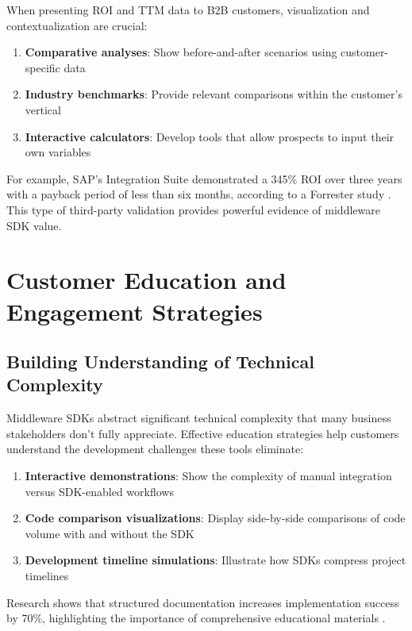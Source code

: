 \documentclass[11pt,a4paper]{article}
\begin{document}
When presenting ROI and TTM data to B2B customers, visualization and contextualization are crucial:

\begin{enumerate}
    \item \textbf{Comparative analyses}: Show before-and-after scenarios using customer-specific data
    \item \textbf{Industry benchmarks}: Provide relevant comparisons within the customer's vertical
    \item \textbf{Interactive calculators}: Develop tools that allow prospects to input their own variables
\end{enumerate}

For example, SAP's Integration Suite demonstrated a 345\% ROI over three years with a payback period of less than six months, according to a Forrester study \cite{sap2024}. This type of third-party validation provides powerful evidence of middleware SDK value.

\section{Customer Education and Engagement Strategies}

\subsection{Building Understanding of Technical Complexity}

Middleware SDKs abstract significant technical complexity that many business stakeholders don't fully appreciate. Effective education strategies help customers understand the development challenges these tools eliminate:

\begin{enumerate}
    \item \textbf{Interactive demonstrations}: Show the complexity of manual integration versus SDK-enabled workflows
    \item \textbf{Code comparison visualizations}: Display side-by-side comparisons of code volume with and without the SDK
    \item \textbf{Development timeline simulations}: Illustrate how SDKs compress project timelines
\end{enumerate}

Research shows that structured documentation increases implementation success by 70\%, highlighting the importance of comprehensive educational materials \cite{ibm2023}.
\end{document}
